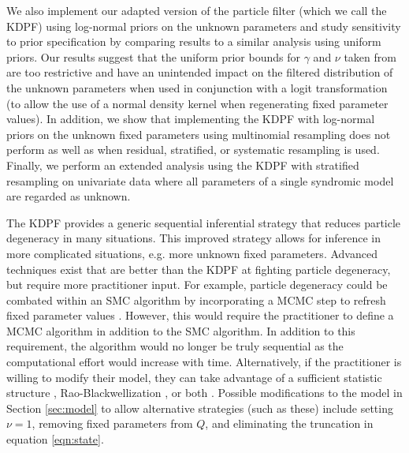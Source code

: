 We also implement our adapted version of the \citet{Liu:West:comb:2001} particle filter (which we call the KDPF) using log-normal priors on the unknown parameters and study sensitivity to prior specification by comparing results to a similar analysis using uniform priors. Our results suggest that the uniform prior bounds for $\gamma$ and $\nu$ taken from \citet{skvortsov2012monitoring} are too restrictive and have an unintended impact on the filtered distribution of the unknown parameters when used in conjunction with a logit transformation (to allow the use of a normal density kernel when regenerating fixed parameter values). In addition, we show that implementing the KDPF with log-normal priors on the unknown fixed parameters using multinomial resampling does not perform as well as when residual, stratified, or systematic resampling is used. Finally, we perform an extended analysis using the KDPF with stratified resampling on univariate data where all parameters of a single syndromic model are regarded as unknown.

The KDPF provides a generic sequential inferential strategy that reduces particle degeneracy in many situations. This improved strategy allows for inference in more complicated situations, e.g. more unknown fixed parameters. Advanced techniques exist that are better than the KDPF at fighting particle degeneracy, but require more practitioner input. For example, particle degeneracy could be combated within an SMC algorithm by incorporating a MCMC step to refresh fixed parameter values \citep{Gilk:Berz:foll:2001,Stor:part:2002}. However, this would require the practitioner to define a MCMC algorithm in addition to the SMC algorithm. In addition to this requirement, the algorithm would no longer be truly sequential as the computational effort would increase with time. Alternatively, if the practitioner is willing to modify their model, they can take advantage of a sufficient statistic structure \citep{Fear:mark:2002}, Rao-Blackwellization \citep{Douc:Gods:Andr:on:2000}, or both \citep{carvalho2010particle}. Possible modifications to the model in Section \ref{sec:model} to allow alternative strategies (such as these) include setting $\nu=1$, removing fixed parameters from $Q$, and eliminating the truncation in equation \eqref{eqn:state}.

